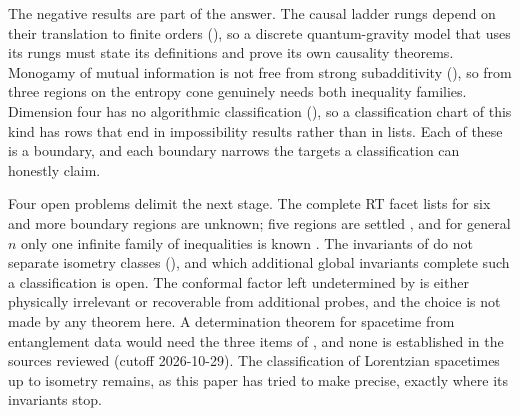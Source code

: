 \documentclass[11pt,letterpaper]{article}
\theoremstyle{definition}
\theoremstyle{remark}
\begin{document}
The negative results are part of the answer. The causal ladder rungs depend on their translation to finite orders (), so a discrete quantum-gravity model that uses its rungs must state its definitions and prove its own causality theorems. Monogamy of mutual information is not free from strong subadditivity (), so from three regions on the entropy cone genuinely needs both inequality families. Dimension four has no algorithmic classification (), so a classification chart of this kind has rows that end in impossibility results rather than in lists. Each of these is a boundary, and each boundary narrows the targets a classification can honestly claim.

Four open problems delimit the next stage. The complete RT facet lists for six and more boundary regions are unknown; five regions are settled \cite{hernandezcuenca}, and for general $n$ only one infinite family of inequalities is known \cite{baoetal}. The invariants of  do not separate isometry classes (), and which additional global invariants complete such a classification is open. The conformal factor left undetermined by  is either physically irrelevant or recoverable from additional probes, and the choice is not made by any theorem here. A determination theorem for spacetime from entanglement data would need the three items of , and none is established in the sources reviewed (cutoff 2026-10-29). The classification of Lorentzian spacetimes up to isometry remains, as this paper has tried to make precise, exactly where its invariants stop.
\end{document}
